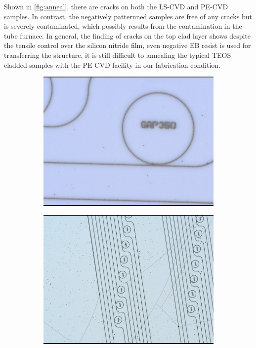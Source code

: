 Shown in \autoref{fig:anneal}, there are cracks on both the LS-CVD and PE-CVD samples. In contrast, the negatively patternned samples are free of any cracks but is severely contaminated, which possibly results from the contamination in the tube furnace. 
In general, the finding of cracks on the top clad layer shows despite the tensile control over the silicon nitride film, even negative EB resist is used for transferring the structure, it is still difficult to annealing the typical TEOS cladded samples with the PE-CVD facility in our fabrication condition.

\begin{figure}
    \centering
    \begin{subfigure}[b]{0.45\textwidth}
    \includegraphics[width=\textwidth]{imgs/jpg/LS_ac}
    \caption{}
    \end{subfigure}
    \begin{subfigure}[b]{0.45\textwidth}
    \includegraphics[width=\textwidth]{imgs/jpg/LS_tc}

\end{subfigure}
\end{figure}

